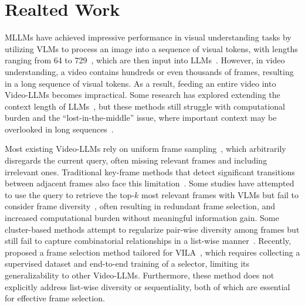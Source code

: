 \section{Realted Work}\label{sec:related_work}

MLLMs have achieved impressive performance in visual understanding tasks by utilizing VLMs to process an image into a sequence of visual tokens, with lengths ranging from 64 to 729~\cite{radford2021learning,zhai2023sigmoid}, which are then input into LLMs~\cite{liu2024llavanext,yang2024qwen2,li2024llava,yao2024minicpm,chen2024far}.
However, in video understanding, a video contains hundreds or even thousands of frames, resulting in a long sequence of visual tokens.
As a result, feeding an entire video into Video-LLMs becomes impractical. 
Some research has explored extending the context length of LLMs~\cite{wan2023efficient,zhang2024longva,xiong2024effective,xue2024longvila,song2024moviechat},
but these methods still struggle with computational burden and the ``lost-in-the-middle'' issue, where important context may be overlooked in long sequences~\cite{liu2024st,yu2024frame}.



Most existing Video-LLMs rely on uniform frame sampling~\cite{chen2023internvl,li2023videochat,liu2024oryx,shu2024video}, 
which arbitrarily disregards the current query, often missing relevant frames and including irrelevant ones.
Traditional key-frame methods that detect significant transitions between adjacent frames also face this limitation~\cite{sheena2015key,nasreen2013key,wolf1996key}.
%
Some studies have attempted to use the query to retrieve the top-$k$ most relevant frames with VLMs but fail to consider frame diversity~\cite{wang2024weakly,yu2024self},
often resulting in redundant frame selection, and increased computational burden without meaningful information gain.
Some cluster-based methods attempt to regularize pair-wise diversity among frames but still fail to capture combinatorial relationships in a list-wise manner~\cite{keplerlab_katna,jin2024chat}. 
%
Recently, \citet{yu2024frame} proposed a frame selection method tailored for VILA~\cite{lin2024vila}, 
which requires collecting a supervised dataset and end-to-end training of a selector, limiting its generalizability to other Video-LLMs.
Furthermore, these method does not explicitly address list-wise diversity or sequentiality, both of which are essential for effective frame selection.



